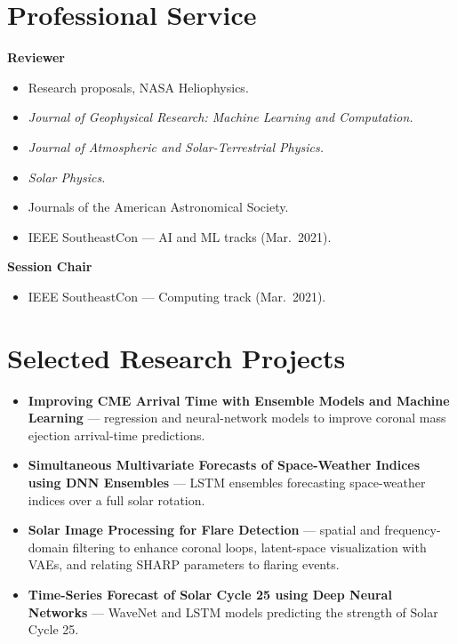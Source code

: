 \documentclass[11pt,letterpaper]{article}
\begin{document}
\section{Professional Service}
\textbf{Reviewer}
\begin{itemize}
  \item Research proposals, NASA Heliophysics.
  \item \textit{Journal of Geophysical Research: Machine Learning and Computation.}
  \item \textit{Journal of Atmospheric and Solar-Terrestrial Physics.}
  \item \textit{Solar Physics.}
  \item Journals of the American Astronomical Society.
  \item IEEE SoutheastCon --- AI and ML tracks (Mar.~2021).
\end{itemize}
\textbf{Session Chair}
\begin{itemize}
  \item IEEE SoutheastCon --- Computing track (Mar.~2021).
\end{itemize}

\section{Selected Research Projects}
\begin{itemize}
  \item \textbf{Improving CME Arrival Time with Ensemble Models and Machine Learning} --- regression and neural-network models to improve coronal mass ejection arrival-time predictions.
  \item \textbf{Simultaneous Multivariate Forecasts of Space-Weather Indices using DNN Ensembles} --- LSTM ensembles forecasting space-weather indices over a full solar rotation.
  \item \textbf{Solar Image Processing for Flare Detection} --- spatial and frequency-domain filtering to enhance coronal loops, latent-space visualization with VAEs, and relating SHARP parameters to flaring events.
  \item \textbf{Time-Series Forecast of Solar Cycle 25 using Deep Neural Networks} --- WaveNet and LSTM models predicting the strength of Solar Cycle 25.
\end{itemize}

\end{document}

